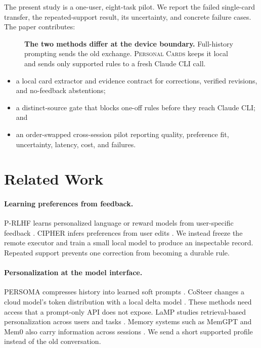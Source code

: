 \documentclass{article}
\newcommand{\method}{\textsc{Personal Cards}}
\begin{document}
The present study is a one-user, eight-task pilot. We report the failed
single-card transfer, the repeated-support result, its uncertainty, and concrete
failure cases. The paper contributes:

\begin{figure}[H]
\centering
\resizebox{\linewidth}{!}{}
\caption{\textbf{The two methods differ at the device boundary.}
Full-history prompting sends the old exchange. \method{} keeps it local and
sends only supported rules to a fresh Claude CLI call.}
\label{fig:motivation}
\end{figure}

\begin{itemize}[leftmargin=1.4em,itemsep=2pt,topsep=3pt]
    \item a local card extractor and evidence contract for corrections,
    verified revisions, and no-feedback abstentions;
    \item a distinct-source gate that blocks one-off rules before they reach
    Claude CLI; and
    \item an order-swapped cross-session pilot reporting quality, preference
    fit, uncertainty, latency, cost, and failures.
\end{itemize}

\section{Related Work}
\label{sec:related}

\paragraph{Learning preferences from feedback.}
P-RLHF learns personalized language or reward models from user-specific
feedback \citep{li2024personalizedrlhf}. CIPHER infers preferences from user
edits \citep{gao2024cipher}. We instead freeze the remote executor and train a
small local model to produce an inspectable record. Repeated support prevents
one correction from becoming a durable rule.

\paragraph{Personalization at the model interface.}
PERSOMA compresses history into learned soft prompts
\citep{hebert2024persoma}. CoSteer changes a cloud model's token distribution
with a local delta model \citep{lv2025costeer}. These methods need access that a
prompt-only API does not expose. LaMP studies retrieval-based personalization
across users and tasks \citep{salemi2023lampwl}. Memory systems such as MemGPT
and Mem0 also carry information across sessions
\citep{packer2023memgpttl,chhikara2025mem0bp}. We send a short supported
profile instead of the old conversation.
\end{document}

